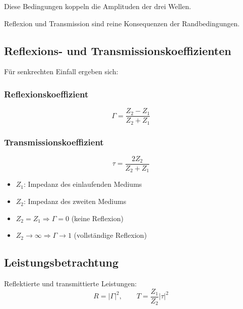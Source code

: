 \documentclass[a4paper]{article}
\begin{document}
Diese Bedingungen koppeln die Amplituden der drei Wellen.

\begin{merke}
Reflexion und Transmission sind reine Konsequenzen der Randbedingungen.
\end{merke}

\subsection{Reflexions- und Transmissionskoeffizienten}

Für senkrechten Einfall ergeben sich:

\subsubsection{Reflexionskoeffizient}

\[
\Gamma = \frac{Z_2 - Z_1}{Z_2 + Z_1}
\]

\subsubsection{Transmissionskoeffizient}

\[
\tau = \frac{2Z_2}{Z_2 + Z_1}
\]

\begin{itemize}
  \item $Z_1$: Impedanz des einlaufenden Mediums
  \item $Z_2$: Impedanz des zweiten Mediums
\end{itemize}

\begin{checkitem}
\begin{itemize}
  \item $Z_2 = Z_1 \Rightarrow \Gamma = 0$ (keine Reflexion)
  \item $Z_2 \to \infty \Rightarrow \Gamma \to 1$ (vollständige Reflexion)
\end{itemize}
\end{checkitem}

\subsection{Leistungsbetrachtung}

Reflektierte und transmittierte Leistungen:
\[
R = |\Gamma|^2,
\qquad
T = \frac{Z_1}{Z_2}|\tau|^2
\]
\end{document}
